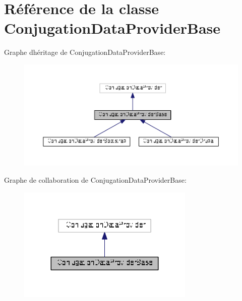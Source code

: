 \hypertarget{class_conjugation_data_provider_base}{}\section{Référence de la classe Conjugation\+Data\+Provider\+Base}
\label{class_conjugation_data_provider_base}


Graphe d\textquotesingle{}héritage de Conjugation\+Data\+Provider\+Base\+:
\nopagebreak
\begin{figure}[H]
\begin{center}
\leavevmode
\includegraphics[width=350pt]{class_conjugation_data_provider_base__inherit__graph}
\end{center}
\end{figure}


Graphe de collaboration de Conjugation\+Data\+Provider\+Base\+:
\nopagebreak
\begin{figure}[H]
\begin{center}
\leavevmode
\includegraphics[width=239pt]{class_conjugation_data_provider_base__coll__graph}
\end{center}
\end{figure}
